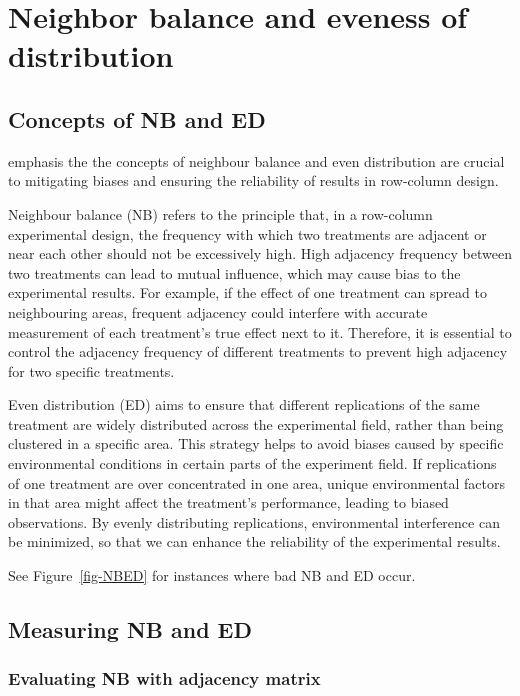\documentclass[
  a4paper,
  oneside,
  openany,
  12pt,
  onecolumn]{book}
\theoremstyle{definition}
\theoremstyle{definition}
\theoremstyle{plain}
\theoremstyle{remark}
\begin{document}
\section{Neighbor balance and eveness of
distribution}\label{neighbor-balance-and-eveness-of-distribution}

\subsection{Concepts of NB and ED}\label{concepts-of-nb-and-ed}

\citet{piepho2018neighbor} emphasis the the concepts of neighbour
balance and even distribution are crucial to mitigating biases and
ensuring the reliability of results in row-column design.

Neighbour balance (NB) refers to the principle that, in a row-column
experimental design, the frequency with which two treatments are
adjacent or near each other should not be excessively high. High
adjacency frequency between two treatments can lead to mutual influence,
which may cause bias to the experimental results. For example, if the
effect of one treatment can spread to neighbouring areas, frequent
adjacency could interfere with accurate measurement of each treatment's
true effect next to it. Therefore, it is essential to control the
adjacency frequency of different treatments to prevent high adjacency
for two specific treatments.

Even distribution (ED) aims to ensure that different replications of the
same treatment are widely distributed across the experimental field,
rather than being clustered in a specific area. This strategy helps to
avoid biases caused by specific environmental conditions in certain
parts of the experiment field. If replications of one treatment are over
concentrated in one area, unique environmental factors in that area
might affect the treatment's performance, leading to biased
observations. By evenly distributing replications, environmental
interference can be minimized, so that we can enhance the reliability of
the experimental results.

See Figure~\ref{fig-NBED} for instances where bad NB and ED occur.

\subsection{Measuring NB and ED}\label{measuring-nb-and-ed}

\subsubsection{Evaluating NB with adjacency
matrix}\label{evaluating-nb-with-adjacency-matrix}
\end{document}
